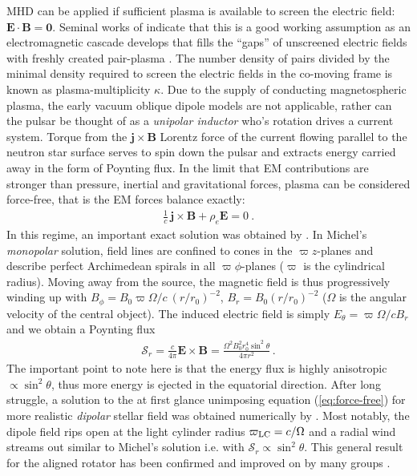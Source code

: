 MHD can be applied if sufficient plasma is available to screen the electric field: $\mathbf{E\cdot B=0}$.  Seminal works of \cite{deutsch1955,1969ApJ...157..869G} indicate that this is a good working assumption as an electromagnetic cascade develops that fills the ``gaps'' of unscreened electric fields with freshly created pair-plasma \citep{Sturrock1971}.  
The number density of pairs divided by the minimal density required to screen the electric fields in the co-moving frame is known as plasma-multiplicity $\kappa$.  
Due to the supply of conducting magnetospheric plasma, the early vacuum oblique dipole models \citep[e.g.][]{pacini1967,Ostriker:1969} are not applicable, rather can the pulsar be thought of as a \emph{unipolar inductor} who's rotation drives a current system.  Torque from the $\mathbf{j\times B}$ Lorentz force of the current flowing parallel to  the neutron star surface serves to spin down the pulsar and extracts energy carried away in the form of Poynting flux.  
In the limit that EM contributions are stronger than pressure, inertial and gravitational forces, plasma can be considered force-free, that is the EM forces balance exactly: 
\begin{align}
\frac{1}{c}\, \mathbf{j\times B}+\rho_e \mathbf{E}=0\ . \label{eq:force-free}
\end{align}
In this regime, an important exact solution was obtained by \cite{1973ApJ...180L.133M}.  In Michel's \emph{monopolar} solution, field lines are confined to cones in the $\varpi z$-planes and describe perfect Archimedean spirals in all $\varpi\phi$-planes ($\varpi$ is the cylindrical radius).  Moving away from the source, the magnetic field is thus progressively winding up with $B_\phi=B_0\varpi\Omega/c\ (r/r_0)^{-2}$, $B_r=B_0(r/r_0)^{-2}$ ($\Omega$ is the angular velocity of the central object).  The induced electric field is simply $E_\theta = \varpi \Omega/c B_r$ and we obtain a Poynting flux 
%
\begin{align}
\mathcal{S}_r=\frac{c}{4\pi} \mathbf{E\times B} = \frac{\Omega^2 B_0^2 r_0^4 \sin^2\theta  }{4\pi r^2}\, . \label{eq:michelpower}
\end{align}
%
The important point to note here is that the energy flux is highly anisotropic $\propto \sin^2\theta$, thus more energy is ejected in the equatorial direction.  
After long struggle, a solution to the at first glance unimposing equation (\ref{eq:force-free}) for more realistic \emph{dipolar} stellar field was obtained numerically by \cite{1999ApJ...511..351C}.  
Most notably, the dipole field rips open at the light cylinder radius $\varpi_{\rm LC} = c/\Omega$ and a radial wind streams out similar to Michel's solution i.e. with $\mathcal{S}_r\propto \sin^2\theta$.  This general result for the aligned rotator has been confirmed and improved on by many groups \citep{2004MNRAS.349..213G,2005PhRvL..94b1101G,2006MNRAS.368L..30M,ParfreyBeloborodov2012,RuizPaschalidis2014}.  
